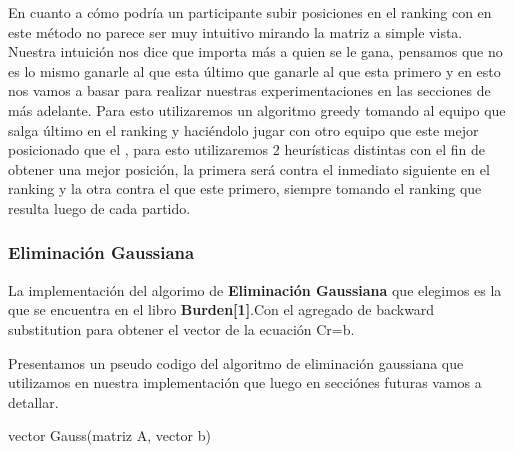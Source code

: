 En cuanto a cómo podría un participante subir posiciones en el ranking con en este método no parece ser muy intuitivo mirando la matriz a simple vista. Nuestra intuición nos dice que importa más a quien se le gana, pensamos que no es lo mismo ganarle al que esta último que ganarle al que esta primero
y en esto nos vamos a basar para realizar nuestras experimentaciones en las secciones de más adelante.
Para esto utilizaremos un algoritmo greedy tomando al equipo que salga último en el ranking y haciéndolo jugar con otro equipo que este mejor posicionado que el , para esto utilizaremos 2 heurísticas distintas
con el fin de obtener una mejor posición, la primera será contra el inmediato siguiente en el ranking y la otra contra el que este primero, siempre tomando el ranking que resulta luego de cada partido.

\subsubsection{Eliminación Gaussiana}
La implementación del algorimo de \textbf{Eliminación Gaussiana} que elegimos es la que se encuentra en el libro \textbf{Burden[1]}.Con el agregado de backward substitution para 
obtener el vector de la ecuaci\'on Cr=b.

Presentamos un pseudo codigo del algoritmo de eliminaci\'on gaussiana que utilizamos en nuestra implementaci\'on que luego en secci\'ones futuras vamos a detallar.

\begin{algorithm}
    \begin{algorithmic}[1]\parskip=2mm
        \caption{vector Gauss(matriz A, vector b)}
        \\
        \\
        \\
        \\
        \\
        \\
        \\
        \\
        \\
        \\
    \end{algorithmic}
\end{algorithm}

